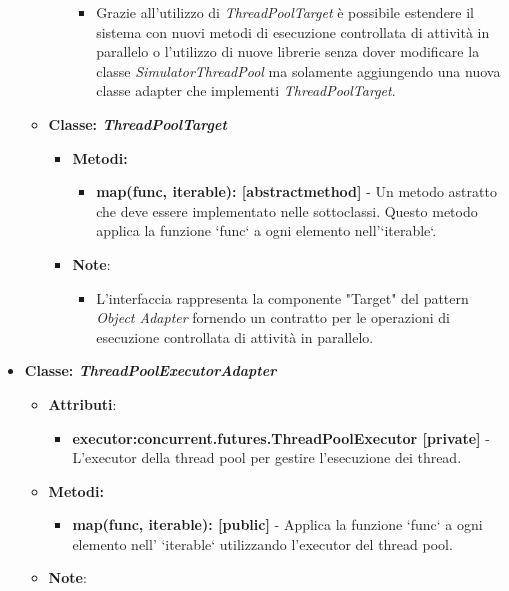 \begin{itemize}
\begin{itemize}
\begin{itemize}
\begin{itemize}
            \item Grazie all'utilizzo di \textit{ThreadPoolTarget} è possibile estendere il sistema con nuovi metodi di esecuzione controllata di attività in parallelo o l'utilizzo di nuove librerie senza dover modificare la classe \textit{SimulatorThreadPool} ma solamente aggiungendo una nuova classe adapter che implementi \textit{ThreadPoolTarget}.
        \end{itemize}
    \end{itemize}
    \item{\textbf{Classe: \textit{ThreadPoolTarget}}}
    \begin{itemize}
    \item\textbf{Metodi: }
    \begin{itemize}
        \item \textbf{map(func, iterable): [abstractmethod]} - Un metodo astratto che deve essere implementato nelle sottoclassi. Questo metodo applica la funzione `func` a ogni elemento nell'`iterable`.
    \end{itemize}
    \item\textbf{Note}:
        \begin{itemize}
            \item L'interfaccia rappresenta la componente "Target" del pattern \textit{Object Adapter} fornendo un contratto per le operazioni di esecuzione controllata di attività in parallelo.
         \end{itemize}
    \end{itemize}
    \end{itemize}
    \item{\textbf{Classe: \textit{ThreadPoolExecutorAdapter}}}
    \begin{itemize}
    \item\textbf{Attributi}:
        \begin{itemize}
        \item \textbf{executor:concurrent.futures.ThreadPoolExecutor [private]} - L'executor della thread pool per gestire l'esecuzione dei thread.
    \end{itemize}
    \item \textbf{Metodi: }
    \begin{itemize}
        \item \textbf{map(func, iterable): [public]} - Applica la funzione `func` a ogni elemento nell' `iterable` utilizzando l'executor del thread pool.
    \end{itemize}
    \item\textbf{Note}:

\end{itemize}
\end{itemize}
